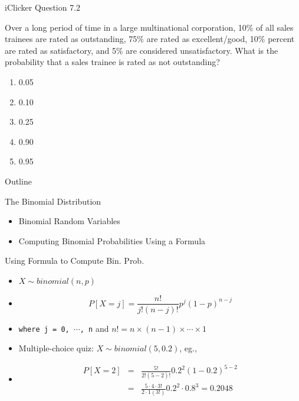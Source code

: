 \documentclass[14pt]{beamer}\usepackage[]{graphicx}\usepackage[]{color}
\begin{document}
\begin{frame}[fragile]{iClicker Question 7.2}

Over a long period of time in a large multinational corporation, 10\% of all sales trainees are rated as outstanding, 75\% are rated as excellent/good, 10\% percent are rated as satisfactory, and 5\% are considered unsatisfactory. What is the probability that a sales trainee is rated as not outstanding?

\begin{enumerate}
\item 0.05
\item 0.10
\item 0.25
\item 0.90
\item 0.95
\end{enumerate}
\end{frame}

\begin{frame}[fragile]{Outline}

The Binomial Distribution  

\begin{itemize}
\item Binomial Random Variables
\item Computing Binomial Probabilities Using a Formula
\end{itemize}
\end{frame}

\begin{frame}[fragile]{Using Formula to Compute Bin. Prob.}

{\small{
\begin{itemize}
\item<1-> $X \sim binomial( n, p)$
\item<1->
\begin{equation*}
  P[X = j] = \frac{n!}{j! (n - j)!} p^j ( 1 - p)^{n - j}
\end{equation*}
\item<1-> \texttt{where j = 0, $\cdots$, n} and $n! = n \times (n-1) \times \cdots \times 1 $
\item<2-> Multiple-choice quiz: $X \sim binomial(5, 0.2)$, eg.,
\item<2->
\begin{eqnarray*}
  P[X = 2] &=& \frac{5!}{2! (5 - 2)!} 0.2^2 ( 1 - 0.2)^{5 - 2} \\
  &=& \frac{5 \cdot 4 \cdot 3!}{2 \cdot 1 (3!)} 0.2^2 \cdot 0.8^3 = 0.2048 
\end{eqnarray*}
\end{itemize}
}}
\end{frame}
\end{document}
